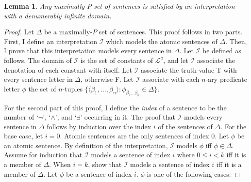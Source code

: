 \documentclass[12pt]{article}
\newtheorem{lemma}[theorem]{Lemma}
\theoremstyle{definition}
\theoremstyle{remark}
\begin{document}
\begin{lemma}
	Any maximally-$P$ set of sentences is satisfied by an interpretation with a denumerably infinite domain.
\end{lemma}

\begin{proof}
	Let $\Delta$ be a maximally-$P$ set of sentences. This proof follows in two parts. First, I define an interpretation $\mathscr{I}$ which models the atomic sentences of $\Delta$. Then, I prove that this interpretation models every sentence in $\Delta$. Let $\mathscr{I}$ be defined as follows. The domain of $\mathscr{I}$ is the set of constants of $\mathscr{L}^a$, and let $\mathscr{I}$ associate the denotation of each constant with itself. Let $\mathscr{I}$ associate the truth-value T with every sentence letter in $\Delta$, otherwise F. Let $\mathscr{I}$ associate with each $n$-ary predicate letter $\phi$ the set of $n$-tuples $\{ \langle \beta_1, ..., \beta_n \rangle : \phi_{\beta_1 ... \beta_n} \in \Delta \}$.
	
	For the second part of this proof, I define the \textit{index} of a sentence to be the number of `$\neg$', `$\land$', and `$\exists$' occurring in it. The proof that $\mathscr{I}$ models every sentence in $\Delta$ follows by induction over the index $i$ of the sentences of $\Delta$. For the base case, let $i=0$. Atomic sentences are the only sentences of index 0. Let $\phi$ be an atomic sentence. By definition of the interpretation, $\mathscr{I}$ models $\phi$ iff $\phi \in \Delta$. Assume for induction that $\mathscr{I}$ models a sentence of index $i$ where $0 \leq i < k$ iff it is a member of $\Delta$. When $i=k$, show that $\mathscr{I}$ models a sentence of index $i$ iff it is a member of $\Delta$. Let $\phi$ be a sentence of index $i$. $\phi$ is one of the following cases:
	

\end{proof}
\end{document}
